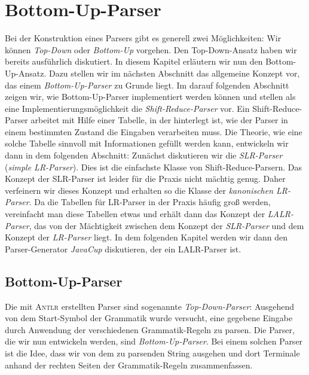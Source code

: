 \chapter{Bottom-Up-Parser\label{chapter:bottom-up}}
Bei der Konstruktion eines Parsers gibt es generell zwei M\"oglichkeiten:  Wir k\"onnen
\emph{Top-Down} oder \emph{Bottom-Up} vorgehen.  Den Top-Down-Ansatz haben wir bereits
ausf\"uhrlich diskutiert.  In diesem Kapitel erl\"autern wir nun den Bottom-Up-Ansatz.
Dazu stellen wir im n\"achsten Abschnitt das allgemeine Konzept vor, das einem
\textsl{Bottom-Up-Parser} zu Grunde liegt.  
Im darauf folgenden Abschnitt zeigen wir, wie Bottom-Up-Parser implementiert werden k\"onnen
und stellen als eine Implementierungsm\"oglichkeit die \emph{Shift-Reduce-Parser} vor.
Ein Shift-Reduce-Parser arbeitet mit Hilfe einer Tabelle, in der
hinterlegt ist, wie der Parser in einem bestimmten Zustand die Eingaben verarbeiten muss.
Die Theorie, wie eine solche Tabelle sinnvoll mit Informationen gef\"ullt werden kann,
entwickeln wir dann in dem folgenden Abschnitt: Zun\"achst diskutieren wir die
\emph{SLR-Parser} (\emph{simple LR-Parser}).  Dies ist die einfachste Klasse von Shift-Reduce-Parsern.
Das Konzept der SLR-Parser ist leider f\"ur die Praxis nicht m\"achtig genug.  Daher verfeinern wir
dieses Konzept und erhalten so die Klasse der
\emph{kanonischen LR-Parser}.  Da die Tabellen f\"ur LR-Parser in der Praxis
h\"aufig gro{\ss} werden, vereinfacht man diese Tabellen etwas und erh\"alt dann das Konzept der
\emph{LALR-Parser}, das von der M\"achtigkeit zwischen dem Konzept der \emph{SLR-Parser} und dem
Konzept der \emph{LR-Parser} liegt.  In dem folgenden Kapitel werden wir dann den Parser-Generator
\textsl{JavaCup} diskutieren, der ein LALR-Parser ist.

\section{Bottom-Up-Parser}
Die mit \textsc{Antlr} erstellten Parser sind sogenannte \emph{Top-Down-Parser}: Ausgehend von dem
Start-Symbol der Grammatik wurde versucht, eine gegebene Eingabe durch Anwendung der verschiedenen
Grammatik-Regeln zu parsen.  Die Parser, die wir nun entwickeln werden, sind
\emph{Bottom-Up-Parser}.  Bei einem solchen Parser ist die Idee, dass wir von dem zu parsenden
String ausgehen und dort Terminale anhand der rechten Seiten der Grammatik-Regeln zusammenfassen.  


